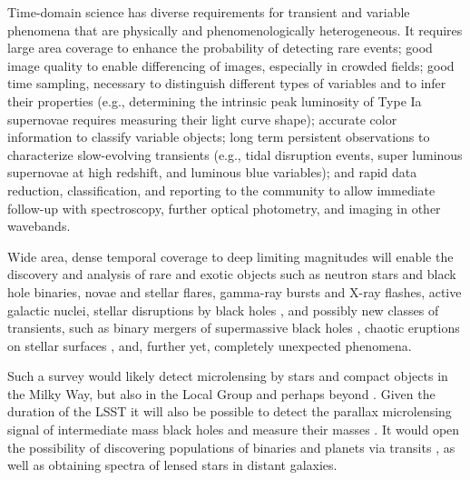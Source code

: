 Time-domain science has diverse requirements for transient and
variable phenomena that are physically and phenomenologically
heterogeneous.  It requires large area coverage to enhance the probability
of detecting rare events; good image quality to enable differencing of
images, especially in crowded fields; good time sampling, necessary to
distinguish different types of variables and to infer
their properties (e.g., determining the intrinsic peak luminosity of Type Ia
supernovae requires measuring their light curve shape); accurate
color information to classify variable objects;
long term
persistent observations to characterize slow-evolving transients
(e.g., tidal disruption events, super luminous supernovae at high
redshift, and luminous blue variables); and rapid data reduction,
classification, and reporting to the community to allow immediate
follow-up with spectroscopy, further optical photometry, and imaging in other
wavebands.

Wide area, dense temporal coverage to deep limiting magnitudes will
enable the discovery and analysis of rare and exotic objects such as
neutron stars and black hole binaries, novae and stellar flares,
gamma-ray bursts and X-ray flashes, active galactic nuclei, stellar
disruptions by black holes \citep{2011Sci...333..203B,2012Natur.485..217G},
and possibly new classes of transients, such as binary mergers of
supermassive black holes \citep{2008ApJ...682..758S},
chaotic
eruptions on stellar surfaces \citep{2011ApJ...741...33A}, and, further yet, completely
unexpected phenomena.

Such a survey would likely detect microlensing by stars and compact objects in
the Milky Way, but also in the Local Group and perhaps beyond \citep{2008A&A...478..755D}.
Given the duration of the LSST it will also be possible
to detect the parallax microlensing signal of intermediate mass black holes and
measure their masses \citep{1992ApJ...392..442G}. It would open the possibility of
discovering populations of binaries and planets via transits
\citep[e.g.,][]{2006Natur.439..437B,2010arXiv1009.3048D,2013ApJ...768..129C,2014ApJ...780...54B},
as well as obtaining spectra of lensed stars in distant galaxies.

